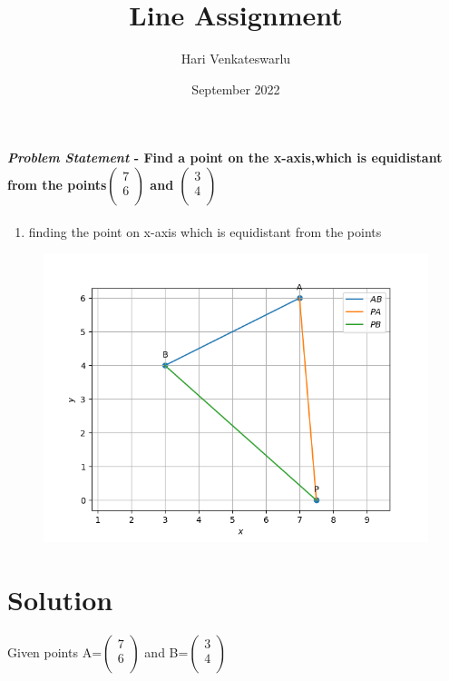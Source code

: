 \documentclass[journal,10pt,twocolumn]{article}
\title{\textbf{Line Assignment}}
\author{Hari Venkateswarlu}
\date{September 2022}
\begin{document}
\maketitle
\paragraph{\textit{Problem Statement} - Find a point on the x-axis,which is equidistant from the points$\begin{pmatrix}
  7 \\
  6 \\
 \end{pmatrix}$ and $\begin{pmatrix}
  3 \\
  4 \\
 \end{pmatrix}$}
\begin{enumerate}
\item finding the point on x-axis which is equidistant from the points
\end{enumerate}

\begin{figure}[h]
\centering
\includegraphics[width=1\columnwidth]{Figure1.png}

\label{fig}
\end{figure}

\section*{Solution}
Given points
A=$\begin{pmatrix}
  7 \\
  6 \\
 \end{pmatrix}$
 and B=$\begin{pmatrix}
  3 \\
  4 \\
 \end{pmatrix}$
\end{document}
